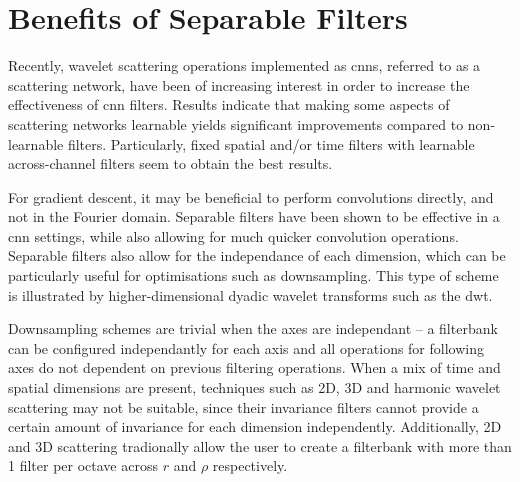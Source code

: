 \section{Benefits of Separable Filters}
\label{sec:p3i:sep}

Recently, wavelet scattering operations implemented as \acp{cnn}, referred to as a scattering network, have been of increasing interest in order to increase the effectiveness of \ac{cnn} filters. Results indicate that making some aspects of scattering networks learnable yields significant improvements compared to non-learnable filters. Particularly, fixed spatial and/or time filters with learnable across-channel filters seem to obtain the best results.

For gradient descent, it may be beneficial to perform convolutions directly, and not in the Fourier domain. Separable filters have been shown to be effective in a \ac{cnn} settings, while also allowing for much quicker convolution operations. Separable filters also allow for the independance of each dimension, which can be particularly useful for optimisations such as downsampling. This type of scheme is illustrated by higher-dimensional dyadic wavelet transforms such as the \ac{dwt}.

Downsampling schemes are trivial when the axes are independant -- a filterbank can be configured independantly for each axis and all operations for following axes do not dependent on previous filtering operations. When a mix of time and spatial dimensions are present, techniques such as 2D, 3D and harmonic wavelet scattering may not be suitable, since their invariance filters cannot provide a certain amount of invariance for each dimension independently. Additionally, 2D and 3D scattering tradionally allow the user to create a filterbank with more than 1 filter per octave across $r$ and $\rho$ respectively.



